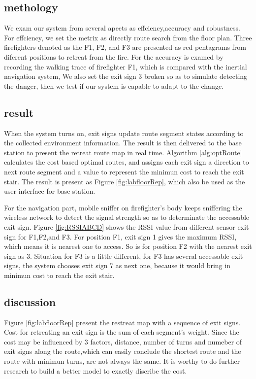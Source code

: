 \documentclass[conference]{IEEEtran}
\begin{document}
  \subsection{methology}
  We exam our system from several apects as effciency,accuracy and robustness. For effciency, we set the metrix as directly route search from the floor plan. Three firefighters denoted as the F1, F2, and F3 are presented as red pentagrams from diferent positions to retreat from the fire. For the accuracy is examed by recording the walking trace of firefighter F1, which is compared with the inertial navigation system, We also set the exit sign 3 broken so as to simulate detecting the danger, then we test if our system is capable to adapt to the change.

  \subsection{result}
  When the system turns on, exit signs update route segment states according to the collected environment information. The result is then delivered to the base station to present the retreat route map in real time. Algorithm \ref{alg:optRoute} calculates the cost based optimal routes, and assigns each exit sign a direction to next route segment and a value to represent the minimun cost to reach the exit stair. The result is present as Figure \ref{fig:labfloorRep}, which also be used as the user interface for base station.

  For the navigation part, mobile sniffer on firefighter's body keeps sniffering the wireless network to detect the signal strength so as to determinate the accessable exit sign. Figure \ref{fig:RSSIABCD} shows the RSSI value from different sensor exit sign for F1,F2,and F3. For position F1, exit sign 1 gives the maximum RSSI, which means it is nearest one to access. So is for position F2 with the nearest exit sign as 3. Situation for F3 is a little different, for F3 has several accessable exit signs, the system chooses exit sign 7 as next one, because it would bring in minimun cost to reach the exit stair.

  \subsection{discussion}
  Figure \ref{fig:labfloorRep} present the restreat map with a sequence of exit signs. Cost for retreating an exit sign is the sum of each segment's weight. Since the cost may be influenced by 3 factors, distance, number of turns and numeber of exit signs along the route,which can easily conclude the shortest route and the route with minimun turns, are not always the same. It is worthy to do further research to build a better model to exactly discribe the cost.
\end{document}
